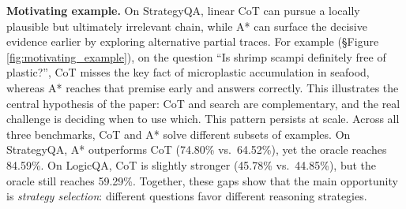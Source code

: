 \documentclass[11pt]{article}
\begin{document}

\textbf{Motivating example.} On StrategyQA, linear CoT can pursue a locally plausible but ultimately irrelevant chain, while A* can surface the decisive evidence earlier by exploring alternative partial traces. For example (\S Figure \ref{fig:motivating_example}), on the question ``Is shrimp scampi definitely free of plastic?'', CoT misses the key fact of microplastic accumulation in seafood, whereas A* reaches that premise early and answers correctly. This illustrates the central hypothesis of the paper: CoT and search are complementary, and the real challenge is deciding when to use which. This pattern persists at scale. Across all three benchmarks, CoT and A* solve different subsets of examples. On StrategyQA, A* outperforms CoT (74.80\% vs.\ 64.52\%), yet the oracle reaches 84.59\%. On LogicQA, CoT is slightly stronger (45.78\% vs.\ 44.85\%), but the oracle still reaches 59.29\%. Together, these gaps show that the main opportunity is \emph{strategy selection}: different questions favor different reasoning strategies.


\end{document}
